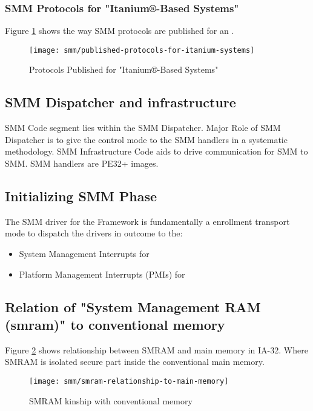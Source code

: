 \subsubsection{SMM Protocols for "Itanium®-Based Systems"}
Figure \ref{fig:published-protocols-for-itanium-systems} shows the way SMM protocols are published for an .
\begin{figure}[!htbp]
	\centering
	\texttt{[image: smm/published-protocols-for-itanium-systems]}
	\caption{Protocols Published for "Itanium®-Based Systems"}\label{fig:published-protocols-for-itanium-systems}
\end{figure}


\subsection{SMM Dispatcher and infrastructure}
SMM Code segment lies within the SMM Dispatcher. Major Role of SMM Dispatcher is to give the control mode to the SMM handlers in a systematic methodology. SMM Infrastructure Code aids to drive communication for SMM to SMM. SMM handlers are PE32+ images.

\subsection{Initializing SMM Phase}
The SMM driver for the Framework is fundamentally a enrollment transport mode to dispatch the drivers in outcome to the:
\begin{itemize}
	\item System Management Interrupts for 
	\item Platform Management Interrupts (PMIs) for 
\end{itemize}

\subsection{Relation of "System Management RAM (\gls{smram})" to conventional memory}
Figure \ref{fig:smram-relationship-to-main-memory} shows relationship between SMRAM and main memory in IA-32. Where SMRAM is isolated secure part inside the conventional main memory.

\begin{figure}[!htbp]
	\centering
	\texttt{[image: smm/smram-relationship-to-main-memory]}
	\caption{SMRAM kinship with conventional memory}\label{fig:smram-relationship-to-main-memory}
\end{figure}


